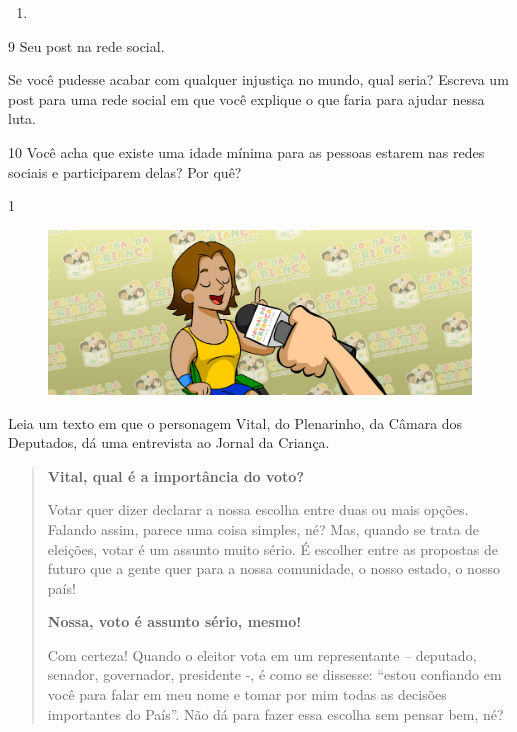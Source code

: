 \begin{itemize}
\begin{itemize}
\begin{itemize}
\begin{itemize}
{{\begin{itemize}
\begin{enumerate}
\item {} 
\end{enumerate}

\num{9} Seu post na rede social.

Se você pudesse acabar com qualquer injustiça no mundo, qual seria?
Escreva um post para uma rede social em que você explique o que faria para ajudar nessa luta.



\num{10} Você acha que existe uma idade mínima para as pessoas estarem nas redes sociais e participarem delas? Por quê?



\num{1}

\begin{figure}[htpb!]
\includegraphics[width=.5\textwidth]{./imgs/img51.png}
\end{figure}

Leia um texto em que o personagem Vital, do Plenarinho, da Câmara dos Deputados, dá uma entrevista ao Jornal da Criança.

\begin{quote}
\textbf{Vital, qual é a importância do voto?}

Votar quer dizer declarar a nossa escolha entre duas ou mais opções.
Falando assim, parece uma coisa simples, né? Mas, quando se trata de
eleições, votar é um assunto muito sério. É escolher entre as propostas
de futuro que a gente quer para a nossa comunidade, o nosso estado, o
nosso país!

\noindent\textbf{Nossa, voto é assunto sério, mesmo!}

Com certeza! Quando o eleitor vota em um representante -- deputado,
senador, governador, presidente -, é como se dissesse: ``estou confiando
em você para falar em meu nome e tomar por mim todas as decisões
importantes do País''. Não dá para fazer essa escolha sem pensar bem,
né?


\end{quote}
\end{itemize}}}
\end{itemize}
\end{itemize}
\end{itemize}
\end{itemize}
